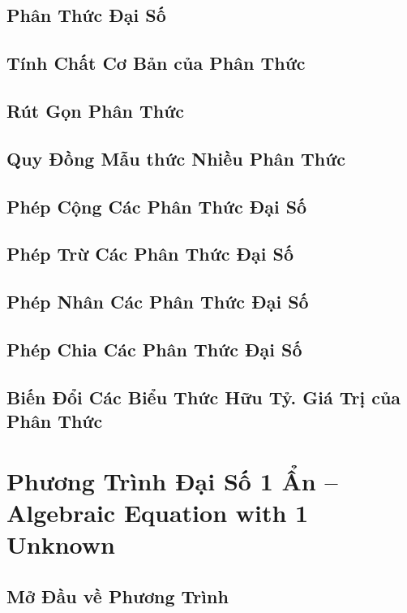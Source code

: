 \documentclass[oneside]{book}
\numberwithin{equation}{section}
\begin{document}
\section{Phân Thức Đại Số}

\section{Tính Chất Cơ Bản của Phân Thức}

\section{Rút Gọn Phân Thức}

\section{Quy Đồng Mẫu thức Nhiều Phân Thức}

\section{Phép Cộng Các Phân Thức Đại Số}

\section{Phép Trừ Các Phân Thức Đại Số}

\section{Phép Nhân Các Phân Thức Đại Số}

\section{Phép Chia Các Phân Thức Đại Số}

\section{Biến Đổi Các Biểu Thức Hữu Tỷ. Giá Trị của Phân Thức}


\chapter{Phương Trình Đại Số 1 Ẩn -- Algebraic Equation with 1 Unknown}

\section{Mở Đầu về Phương Trình}
\end{document}
